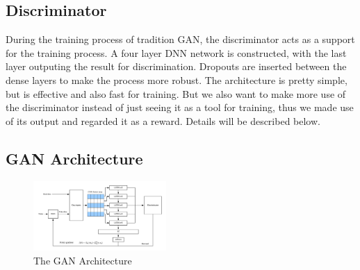 \documentclass{acmtog} %
\begin{document}
\begin{table}[h]
\end{table}

\subsection{Discriminator}
During the training process of tradition GAN, the discriminator acts as a support for the training process. A four layer DNN network is constructed, with the last layer outputing the result for discrimination. Dropouts are inserted between the dense layers to make the process more robust. The architecture is pretty simple, but is effective and also fast for training. But we also want to make more use of the discriminator instead of just seeing it as a tool for training, thus we made use of its output and regarded it as a reward. Details will be described below.

\subsection{GAN Architecture}
\begin{figure}[h]
   \begin{center}
      \includegraphics[width=0.45\textwidth]{gan.png}
   \end{center}
\caption{The GAN Architecture}
\label{RTL}
\end{figure}
\end{document}
